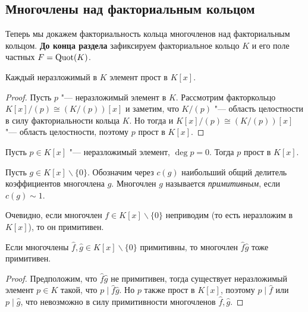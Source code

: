 \subsection{Многочлены над факториальным кольцом}

Теперь мы докажем факториальность кольца многочленов над факториальным кольцом. \textbf{До конца раздела} зафиксируем факториальное кольцо $K$ и его поле частных $F = \operatorname{Quot}(K)$.

\begin{proposition}
	Каждый неразложимый в $K$ элемент прост в $K[x]$.
\end{proposition}

\begin{proof}
	Пусть $p$ "--- неразложимый элемент в $K$. Рассмотрим факторкольцо $K[x] / (p) \cong (K / (p))[x]$ и заметим, что $K / (p)$ "--- область целостности в силу факториальности кольца $K$. Но тогда и $K[x] / (p) \cong (K / (p))[x]$ "--- область целостности, поэтому $p$ прост в $K[x]$.
\end{proof}

\begin{corollary}
	Пусть $p \in K[x]$ "--- неразложимый элемент, $\deg{p} = 0$. Тогда $p$ прост в $K[x]$.
\end{corollary}

\begin{definition}
	Пусть $g \in K[x] \backslash \{0\}$. Обозначим через $c(g)$ наибольший общий делитель коэффициентов многочлена $g$. Многочлен $g$ называется \textit{примитивным}, если $c(g) \sim 1$.
\end{definition}

\begin{note}
	Очевидно, если многочлен $f \in K[x] \backslash \{0\}$ неприводим (то есть неразложим в $K[x]$), то он примитивен.
\end{note}

\begin{proposition}
	Если многочлены $\widehat{f}, \widehat{g} \in K[x] \backslash \{0\}$ примитивны, то многочлен $\widehat{f}\widehat{g}$ тоже примитивен.
\end{proposition}

\begin{proof}
	Предположим, что $\widehat{f}\widehat{g}$ не примитивен, тогда существует неразложимый элемент $p \in K$ такой, что $p \mid \widehat{f}\widehat{g}$. Но $p$ также прост в $K[x]$, поэтому $p \mid \widehat{f}$ или $p \mid \widehat{g}$, что невозможно в силу примитивности многочленов $\widehat{f}, \widehat{g}$.
\end{proof}

